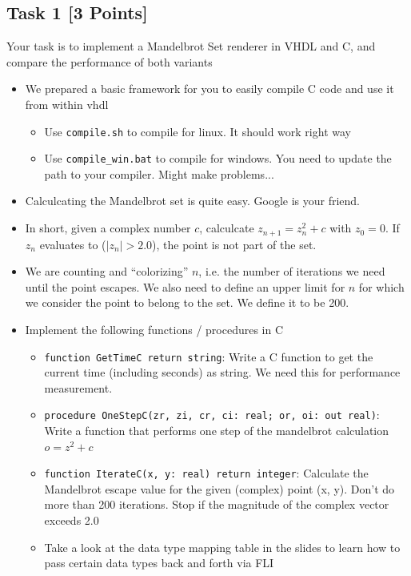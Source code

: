 \documentclass[12pt,epsf,makeidx,oneside]{book}
\begin{document}
\subsection{Task 1 [3 Points]}
  Your task is to implement a Mandelbrot Set renderer in VHDL and C, and compare the performance of both variants
  \begin{itemize}[noitemsep]
    \item We prepared a basic framework for you to easily compile C code and use it from within vhdl
    \begin{itemize}[noitemsep]
      \item Use {\tt compile.sh} to compile for linux. It should work right way
      \item Use {\tt compile\_win.bat} to compile for windows. You need to update the path to your compiler. Might make problems...
    \end{itemize}
    \item Calculcating the Mandelbrot set is quite easy. Google is your friend.
    \item In short, given a complex number $c$, calculcate $z_{n+1}=z_n^2+c$ with $z_0=0$. If $z_n$ evaluates to ($|z_n|>2.0$), the point is not part of the set. 
    \item We are counting and ``colorizing'' $n$, i.e. the number of iterations we need until the point escapes. We also need to define an upper limit for $n$
          for which we consider the point to belong to the set. We define it to be 200.
    \item Implement the following functions / procedures in C
    \begin{itemize}[noitemsep]
      \item {\tt function GetTimeC return string}: Write a C function to get the current time (including seconds) as string. We need this for performance measurement.
      \item {\tt procedure OneStepC(zr, zi, cr, ci: real; or, oi: out real)}: Write a function that performs one step of the mandelbrot calculation $o=z^2+c$
      \item {\tt function IterateC(x, y: real) return integer}: Calculate the Mandelbrot escape value for the given (complex) point (x, y). Don't do more than 200 iterations. 
            Stop if the magnitude of the complex vector exceeds 2.0
      \item Take a look at the data type mapping table in the slides to learn how to pass certain data types back and forth via FLI
    \end{itemize}

\end{itemize}
\end{document}
